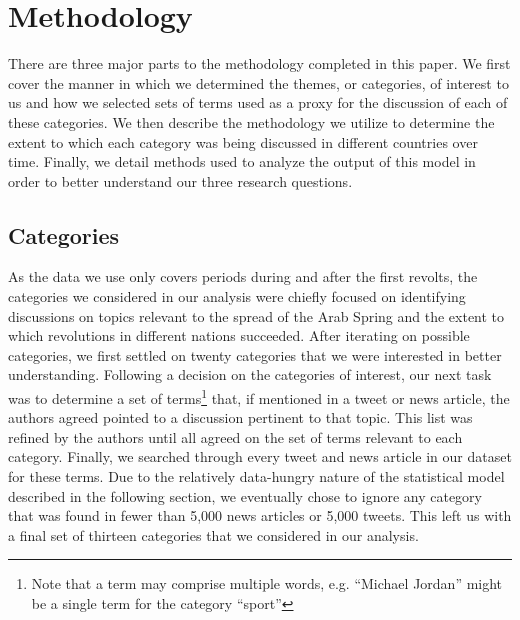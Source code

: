   
\section{Methodology}

There are three major parts to the methodology completed in this paper.  We first cover the manner in which we determined the themes, or categories, of interest to us and how we selected sets of terms used as a proxy for the discussion of each of these categories. We then describe the methodology we utilize to determine the extent to which each category was being discussed in different countries over time. Finally, we detail methods used to analyze the output of this model in order to better understand our three research questions.

\subsection{Categories}

As the data we use only covers periods during and after the first revolts, the categories we considered in our analysis were chiefly focused on identifying discussions on topics relevant to the spread of the Arab Spring and the extent to which revolutions in different nations succeeded.  After iterating on possible categories, we first settled on twenty categories that we were interested in better understanding. Following a decision on the categories of interest, our next task was to determine a set of terms\footnote{Note that a term may comprise multiple words, e.g. ``Michael Jordan'' might be a single term for the category ``sport''} that, if mentioned in a tweet or news article, the authors agreed pointed to a discussion pertinent to that topic.  This list was refined by the authors until all agreed on the set of terms relevant to each category. Finally, we searched through every tweet and news article in our dataset for these terms.  Due to the relatively data-hungry nature of the statistical model described in the following section, we eventually chose to ignore any category that was found in fewer than 5,000 news articles or 5,000 tweets.  This left us with a final set of thirteen categories that we considered in our analysis.

